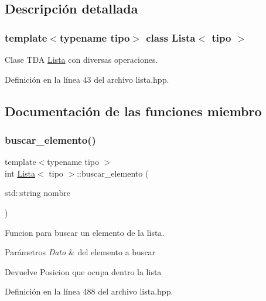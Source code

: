 \subsection{Descripción detallada}
\subsubsection*{template$<$typename tipo$>$\newline
class Lista$<$ tipo $>$}

Clase T\+DA \hyperlink{classLista}{Lista} con diversas operaciones. 

Definición en la línea 43 del archivo lista.\+hpp.



\subsection{Documentación de las funciones miembro}
\mbox{\label{classLista_a18cad7f9b4ae2e76a3083e8e25246588}} 
\subsubsection{\texorpdfstring{buscar\+\_\+elemento()}{buscar\_elemento()}}
{\footnotesize\ttfamily template$<$typename tipo $>$ \\
int \hyperlink{classLista}{Lista}$<$ tipo $>$\+::buscar\+\_\+elemento (\begin{DoxyParamCaption}\item[{std\+::string}]{nombre }\end{DoxyParamCaption})}



Funcion para buscar un elemento de la lista. 


\begin{DoxyParams}{Parámetros}
{\em Dato} & del elemento a buscar \\
\hline
\end{DoxyParams}
\begin{DoxyReturn}{Devuelve}
Posicion que ocupa dentro la lista 
\end{DoxyReturn}


Definición en la línea 488 del archivo lista.\+hpp.

\mbox{\label{classLista_a63f1a416d1bc0eb65b708f99cff25677}} 
